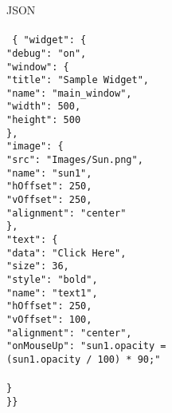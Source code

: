 \begin{minipage}{0.5\textwidth}
{\Large JSON}\\\\
\texttt{\small
\{ "widget": \{\\
\hspace*{6mm}"debug": "on",\\
\hspace*{6mm}"window": \{\\
\hspace*{8mm}"title": "Sample Widget",\\
\hspace*{8mm}"name": "main\_window",\\
\hspace*{8mm}"width": 500,\\
\hspace*{8mm}"height": 500\\
\hspace*{6mm}\},\\
\hspace*{6mm}"image": \{\\ 
\hspace*{8mm}"src": "Images/Sun.png",\\
\hspace*{8mm}"name": "sun1",\\
\hspace*{8mm}"hOffset": 250,\\
\hspace*{8mm}"vOffset": 250,\\
\hspace*{8mm}"alignment": "center"\\
\hspace*{6mm}\},\\
\hspace*{6mm}"text": \{\\
\hspace*{8mm}"data": "Click Here",\\
\hspace*{8mm}"size": 36,\\
\hspace*{8mm}"style": "bold",\\
\hspace*{8mm}"name": "text1",\\
\hspace*{8mm}"hOffset": 250,\\
\hspace*{8mm}"vOffset": 100,\\
\hspace*{8mm}"alignment": "center",\\
\hspace*{8mm}"onMouseUp": "sun1.opacity =\\
\hspace*{10mm}(sun1.opacity / 100) * 90;"\\\\
\hspace*{6mm}\}\\
\}\}
}
\end{minipage}